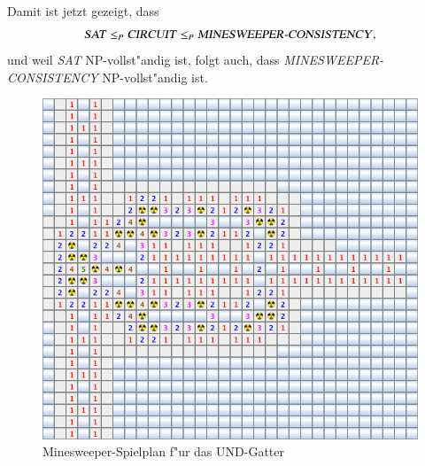 Damit ist jetzt gezeigt, dass
\[
\text{\textsl{SAT}}\le_P
\text{\textsl{CIRCUIT}}\le_P\text{\textsl{MINESWEEPER-CONSISTENCY}},
\]
und weil \textsl{SAT} NP-vollst"andig ist, folgt auch, dass 
\textsl{MINESWEEPER-CONSISTENCY} NP-vollst"andig ist.
\begin{figure}
\begin{center}
\includegraphics[width=0.8\hsize]{graphics/and}
\end{center}
\caption{Minesweeper-Spielplan f"ur das UND-Gatter\label{andgate}}
\end{figure}%
